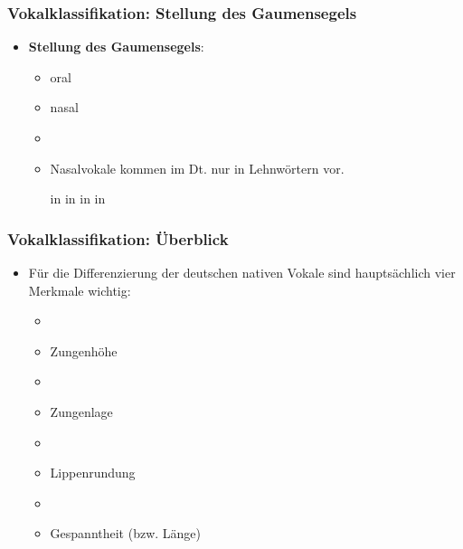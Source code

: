 \begin{frame}
\frametitle{Vokalklassifikation: Stellung des Gaumensegels}

	\begin{itemize}
	
		
		
		\item \textbf{Stellung des Gaumensegels}:
		
		\begin{itemize}
			\item oral
			\item nasal
			\item[]
			\item Nasalvokale kommen im Dt. nur in Lehnwörtern vor.

			\eal
			\ex \textipa{[ \~a ]} in 
			\ex \textipa{[ \~E ]} in 
			\ex \textipa{[ \~a ]} in 
			\ex \textipa{[ \~\oe\ ]} in 
			\zl
		
		\end{itemize}
		
	\end{itemize}
	
\end{frame}



\begin{frame}
\frametitle{Vokalklassifikation: Überblick}

	\begin{itemize}
		\item Für die Differenzierung der deutschen nativen Vokale sind hauptsächlich vier Merkmale wichtig:
		
		\begin{itemize}
			\item[]
			\item Zungenhöhe
			\item[]
			\item Zungenlage
			\item[]
			\item Lippenrundung
			\item[]
			\item Gespanntheit (bzw. Länge)
		\end{itemize}
		
	\end{itemize}
	
\end{frame}


